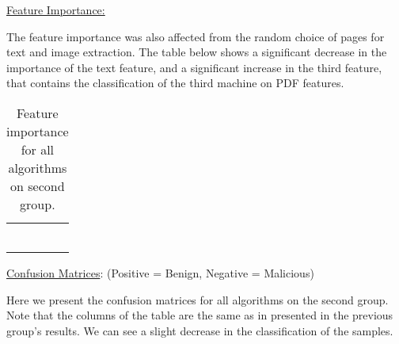 \documentclass{article}
\begin{document}
\clearpage
\newpage

\noindent\underline{Feature Importance:}

\indent	The feature importance was also affected from the random choice of pages for text and image extraction. The table below shows a significant decrease in the importance of the text feature, and a significant increase in the third feature, that contains the classification of the third machine on PDF features. 

\begin{table}[htb]
\centering
\begin{tabular}{|M{2.5cm}|M{2.5cm}|M{2.5cm}|M{2.5cm}|}
	\hline
	\centering{} &  &  & \tabularnewline
	\hline
	 &  &  & \tabularnewline
	\hline
	 &  &  & \tabularnewline
	\hline
	 &  &  & \tabularnewline
	\hline
	 &  &  & \tabularnewline
	\hline
	 &  &  & \tabularnewline
	\hline
	 &  &  & \tabularnewline
	\hline	
\end{tabular}
\caption{Feature importance for all algorithms on second group.}
\end{table}

\noindent\underline{Confusion Matrices}: (Positive = Benign, Negative = Malicious) 

\indent Here we present the confusion matrices for all algorithms on the second group. Note that the columns of the table are the same as in presented in the previous group's results. We can see a slight decrease in the classification of the samples.

\clearpage
\newpage
\end{document}
